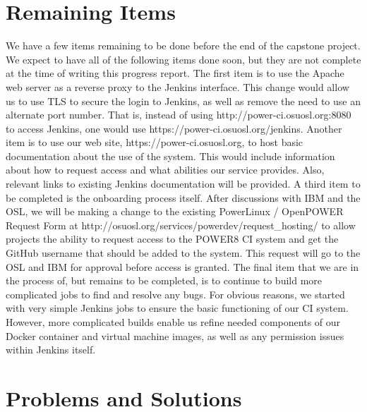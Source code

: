 \documentclass[10pt,onecolumn,journal,draftclsnofoot]{IEEEtran}
\begin{document}
\section{Remaining Items}
We have a few items remaining to be done before the end of the capstone project.
We expect to have all of the following items done soon, but they are not complete at the time of writing this progress report.
The first item is to use the Apache web server as a reverse proxy to the Jenkins interface.
This change would allow us to use TLS to secure the login to Jenkins, as well as remove the need to use an alternate port number. 
That is, instead of using http://power-ci.osuosl.org:8080 to access Jenkins, one would use https://power-ci.osuosl.org/jenkins. 
Another item is to use our web site, https://power-ci.osuosl.org, to host basic documentation about the use of the system.
This would include information about how to request access and what abilities our service provides.
Also, relevant links to existing Jenkins documentation will be provided. 
A third item to be completed is the onboarding process itself. 
After discussions with IBM and the OSL, we will be making a change to the existing PowerLinux / OpenPOWER Request Form at http://osuosl.org/services/powerdev/request\_hosting/ to allow projects the ability to request access to the POWER8 CI system and get the GitHub username that should be added to the system. 
This request will go to the OSL and IBM for approval before access is granted.
The final item that we are in the process of, but remains to be completed, is to continue to build more complicated jobs to find and resolve any bugs.
For obvious reasons, we started with very simple Jenkins jobs to ensure the basic functioning of our CI system.
However, more complicated builds enable us refine needed components of our Docker container and virtual machine images, as well as any permission issues within Jenkins itself.


\section{Problems and Solutions}
\end{document}
